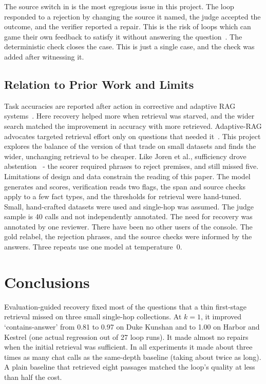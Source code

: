 \documentclass[12pt, a4paper, oneside]{report}
\newcommand{\code}[1]{\texttt{\detokenize{#1}}}
\begin{document}
The source switch in \code{gold-029} is the most egregious issue in this
project. The loop responded to a rejection by changing the source it named, the judge
accepted the outcome, and the verifier reported a repair. This is the risk
of loops which can game their own feedback to satisfy it without answering
the question~\cite{huang2024cannot,kamoi2024selfcorrection}. The
deterministic check closes the case. This is just
a single case, and the check was added after witnessing it.

\section{Relation to Prior Work and Limits}

Task accuracies are reported after action in corrective and adaptive RAG
systems~\cite{jiang2023flare,asai2024selfrag,yan2024crag,jeong2024adaptiverag}.
Here recovery helped more when retrieval was starved, and the wider search
matched the improvement in accuracy with more retrieved. Adaptive-RAG
advocates targeted retrieval effort only on questions that needed
it~\cite{jeong2024adaptiverag}. This project explores the balance of the
version of that trade on small datasets and finds the wider, unchanging
retrieval to be cheaper. Like Joren et al., sufficiency drove
abstention~\cite{joren2025sufficient} - the scorer required phrases to
reject premises, and still missed five. Limitations of design and data
constrain the reading of this paper. The model generates and scores,
verification reads two flags, the span and source checks apply to a few
fact types, and the thresholds for retrieval were hand-tuned. Small,
hand-crafted datasets were used and single-hop was assumed. The judge
sample is 40 calls and not independently annotated. The need for recovery
was annotated by one reviewer. There have been no other users of the
console. The gold relabel, the rejection phrases, and the source checks
were informed by the answers. Three repeats use one model at
temperature~0.


\chapter{Conclusions}
\label{conclusions}

Evaluation-guided recovery fixed most of the questions that a thin
first-stage retrieval missed on three small single-hop collections. At
$k=1$, it improved `contains-answer' from 0.81 to 0.97 on Duke Kunshan and
to 1.00 on Harbor and Kestrel (one actual regression out of 27 loop
runs). It made almost no repairs when the initial retrieval was sufficient. In all
experiments it made about three times as many chat calls as the same-depth
baseline (taking about twice as long). A plain baseline that retrieved
eight passages matched the loop's quality at less than half the cost.
\end{document}
